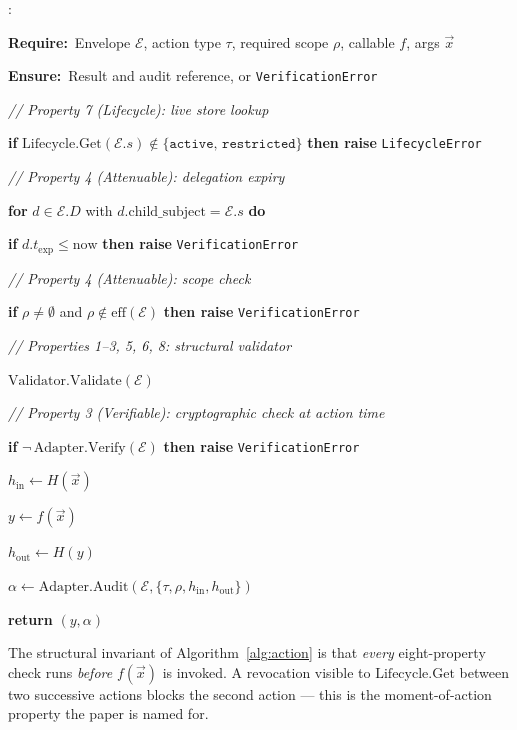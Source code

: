 \documentclass[11pt,a4paper]{article}
\newcommand{\AlgKwd}[1]{\textbf{#1}}
\newcommand{\Require}{\AlgKwd{Require:}~}
\newcommand{\Ensure}{\AlgKwd{Ensure:}~}
\newenvironment{algorithmic}
  {\begin{framed}\small\begin{list}{\arabic{enumi}:}{%
      \usecounter{enumi}\setlength{\itemsep}{0pt}\setlength{\parsep}{0pt}%
      \setlength{\leftmargin}{2.2em}\setlength{\labelwidth}{1.8em}}}
  {\end{list}\end{framed}}
\begin{document}
\begin{algo}
\caption{\textsc{RunMaterialAction}($\mathcal{E}, \tau, \rho, f, \vec{x}$)}\label{alg:action}
\begin{algorithmic}
\item \Require Envelope $\mathcal{E}$, action type $\tau$, required scope $\rho$, callable $f$, args $\vec{x}$
\item \Ensure Result and audit reference, or \texttt{VerificationError}
\item \textit{// Property 7 (Lifecycle): live store lookup}
\item \textbf{if} $\mathrm{Lifecycle.Get}(\mathcal{E}.s) \notin \{\texttt{active},\, \texttt{restricted}\}$ \textbf{then raise} \texttt{LifecycleError}
\item \textit{// Property 4 (Attenuable): delegation expiry}
\item \textbf{for} $d \in \mathcal{E}.D$ with $d.\text{child\_subject} = \mathcal{E}.s$ \textbf{do}
\item \quad \textbf{if} $d.t_\text{exp} \leq \mathrm{now}$ \textbf{then raise} \texttt{VerificationError}
\item \textit{// Property 4 (Attenuable): scope check}
\item \textbf{if} $\rho \neq \emptyset$ and $\rho \notin \text{eff}(\mathcal{E})$ \textbf{then raise} \texttt{VerificationError}
\item \textit{// Properties 1--3, 5, 6, 8: structural validator}
\item $\mathrm{Validator.Validate}(\mathcal{E})$
\item \textit{// Property 3 (Verifiable): cryptographic check at action time}
\item \textbf{if} $\neg\,\mathrm{Adapter.Verify}(\mathcal{E})$ \textbf{then raise} \texttt{VerificationError}
\item $h_\text{in} \gets H(\vec{x})$
\item $y \gets f(\vec{x})$
\item $h_\text{out} \gets H(y)$
\item $\alpha \gets \mathrm{Adapter.Audit}(\mathcal{E}, \{\tau, \rho, h_\text{in}, h_\text{out}\})$
\item \textbf{return} $(y, \alpha)$
\end{algorithmic}
\end{algo}

The structural invariant of Algorithm~\ref{alg:action} is that
\emph{every} eight-property check runs \emph{before} $f(\vec{x})$ is
invoked. A revocation visible to $\mathrm{Lifecycle.Get}$ between two
successive actions blocks the second action --- this is the moment-of-action
property the paper is named for.
\end{document}
